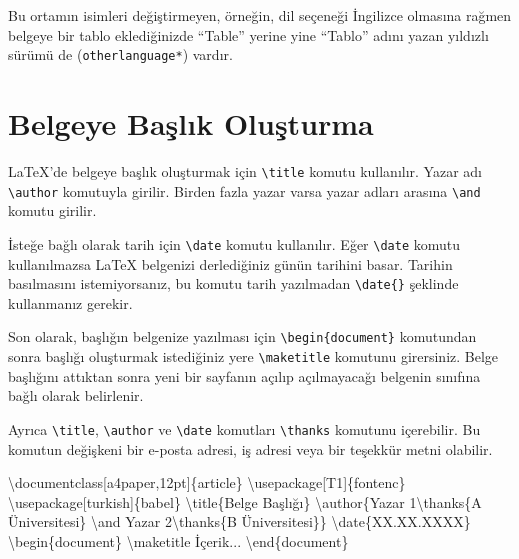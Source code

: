 \documentclass[
  letterpaper,
  DIV=11,
  numbers=noendperiod]{scrreprt}
\newenvironment{Shaded}{\begin{snugshade}}{\end{snugshade}}
\newcommand{\BuiltInTok}[1]{\textcolor[rgb]{0.00,0.23,0.31}{#1}}
\newcommand{\ExtensionTok}[1]{\textcolor[rgb]{0.00,0.23,0.31}{#1}}
\newcommand{\FunctionTok}[1]{\textcolor[rgb]{0.28,0.35,0.67}{#1}}
\newcommand{\KeywordTok}[1]{\textcolor[rgb]{0.00,0.23,0.31}{#1}}
\newcommand{\NormalTok}[1]{\textcolor[rgb]{0.00,0.23,0.31}{#1}}
\begin{document}
Bu ortamın isimleri değiştirmeyen, örneğin, dil seçeneği İngilizce
olmasına rağmen belgeye bir tablo eklediğinizde ``Table'' yerine yine
``Tablo'' adını yazan yıldızlı sürümü de (\texttt{otherlanguage*})
vardır.

\hypertarget{belgeye-baux15flux131k-oluux15fturma}{%
\section{Belgeye Başlık
Oluşturma}\label{belgeye-baux15flux131k-oluux15fturma}}

{\LaTeX}'de belgeye başlık oluşturmak için
\texttt{\textbackslash{}title} komutu kullanılır. Yazar adı
\texttt{\textbackslash{}author} komutuyla girilir. Birden fazla yazar
varsa yazar adları arasına \texttt{\textbackslash{}and} komutu girilir.

İsteğe bağlı olarak tarih için \texttt{\textbackslash{}date} komutu
kullanılır. Eğer \texttt{\textbackslash{}date} komutu kullanılmazsa
{\LaTeX} belgenizi derlediğiniz günün tarihini basar. Tarihin
basılmasını istemiyorsanız, bu komutu tarih yazılmadan
\texttt{\textbackslash{}date\{\}} şeklinde kullanmanız gerekir.

Son olarak, başlığın belgenize yazılması için
\texttt{\textbackslash{}begin\{document\}} komutundan sonra başlığı
oluşturmak istediğiniz yere \texttt{\textbackslash{}maketitle} komutunu
girersiniz. Belge başlığını attıktan sonra yeni bir sayfanın açılıp
açılmayacağı belgenin sınıfına bağlı olarak belirlenir.

Ayrıca \texttt{\textbackslash{}title}, \texttt{\textbackslash{}author}
ve \texttt{\textbackslash{}date} komutları
\texttt{\textbackslash{}thanks} komutunu içerebilir. Bu komutun
değişkeni bir e-posta adresi, iş adresi veya bir teşekkür metni
olabilir.

\begin{Shaded}
\begin{Highlighting}[]
\BuiltInTok{\textbackslash{}documentclass}\NormalTok{[a4paper,12pt]\{}\ExtensionTok{article}\NormalTok{\}}
\BuiltInTok{\textbackslash{}usepackage}\NormalTok{[T1]\{}\ExtensionTok{fontenc}\NormalTok{\}}
\BuiltInTok{\textbackslash{}usepackage}\NormalTok{[turkish]\{}\ExtensionTok{babel}\NormalTok{\}}
\FunctionTok{\textbackslash{}title}\NormalTok{\{Belge Başlığı\}}
\FunctionTok{\textbackslash{}author}\NormalTok{\{Yazar 1}\FunctionTok{\textbackslash{}thanks}\NormalTok{\{A Üniversitesi\} }\FunctionTok{\textbackslash{}and}\NormalTok{ Yazar 2}\FunctionTok{\textbackslash{}thanks}\NormalTok{\{B Üniversitesi\}\}}
\FunctionTok{\textbackslash{}date}\NormalTok{\{XX.XX.XXXX\}}
\KeywordTok{\textbackslash{}begin}\NormalTok{\{}\ExtensionTok{document}\NormalTok{\}}
\FunctionTok{\textbackslash{}maketitle}
\NormalTok{  İçerik...}
\KeywordTok{\textbackslash{}end}\NormalTok{\{}\ExtensionTok{document}\NormalTok{\}}
\end{Highlighting}
\end{Shaded}
\end{document}
